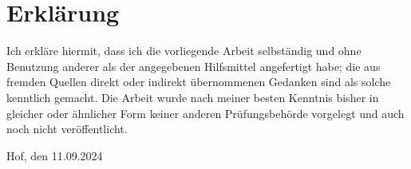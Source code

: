 \clearpage
{}
\pagestyle{empty}

\section*{Erklärung}

\vspace*{2cm}

\noindent Ich erkläre hiermit, dass ich die vorliegende Arbeit selbständig und ohne Benutzung
anderer als der angegebenen Hilfsmittel angefertigt habe; die aus fremden Quellen
direkt oder indirekt übernommenen Gedanken sind als solche kenntlich gemacht.
Die Arbeit wurde nach meiner besten Kenntnis bisher in gleicher oder ähnlicher Form
keiner anderen Prüfungsbehörde vorgelegt und auch noch nicht veröffentlicht.

\vspace*{5cm}

\noindent Hof, den 11.09.2024

\vspace*{3cm}

\noindent \myname

\restoregeometry